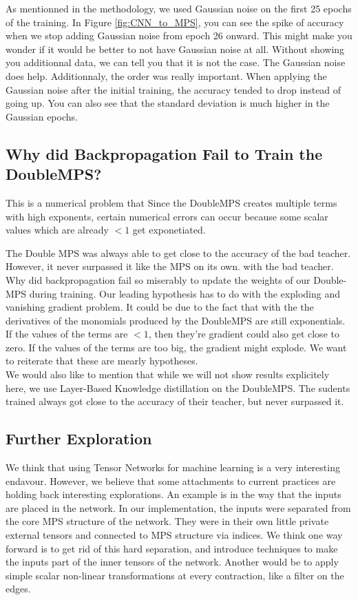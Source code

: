 \documentclass{article}
\theoremstyle{definition}
\theoremstyle{definition}
\begin{document}
As mentionned in the methodology, we used Gaussian noise on the first 25 epochs of the training. In Figure \ref{fig:CNN_to_MPS}, you can see the spike of accuracy when we stop adding Gaussian noise from epoch 26 onward. This might make you wonder if it would be better to not have Gaussian noise at all. Without showing you additionnal data, we can tell you that it is not the case. The Gaussian noise does help. Additionnaly, the order was really important. When applying the Gaussian noise after the initial training, the accuracy tended to drop instead of going up. You can also see that the standard deviation is much higher in the Gaussian epochs.



\subsection{Why did Backpropagation Fail to Train the DoubleMPS?}


This is a numerical problem that Since the DoubleMPS creates multiple terms with high exponents, certain numerical errors can occur because some scalar values which are already $<1$ get exponetiated. 


The Double MPS was always able to get close to the accuracy of the bad teacher. However, it never surpassed it like the MPS on its own. with the bad teacher.
Why did backpropagation fail so miserably to update the weights of our Double-MPS during training. Our leading hypothesis has to do with the exploding and vanishing gradient problem\cite{pascanu2013difficulty}. It could be due to the fact that with the the derivatives of the monomials produced by the DoubleMPS are still exponentials. If the values of the terms are $<1$, then they're gradient could also get close to zero. If the values of the terms are too big, the gradient might explode. We want to reiterate that these are mearly hypotheses. \\

We would also like to mention that while we will not show results explicitely here, we use Layer-Based Knowledge distillation on the DoubleMPS. The sudents trained always got close to the accuracy of their teacher, but never surpassed it.


\subsection{Further Exploration}
We think that using Tensor Networks for machine learning is a very interesting endavour. However, we believe that some attachments to current practices are holding back interesting explorations. An example is in the way that the inputs are placed in the network. In our implementation, the inputs were separated from the core MPS structure of the network. They were in their own little private external tensors and connected to MPS structure via indices. We think one way forward is to get rid of this hard separation, and introduce techniques to make the inputs part of the inner tensors of the network. Another would be to apply simple scalar non-linear transformations at every contraction, like a filter on the edges. \\
\end{document}

